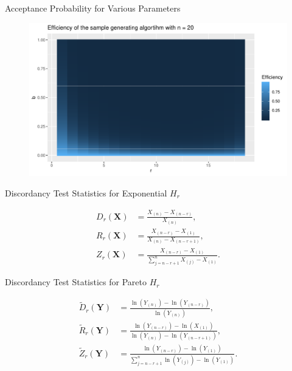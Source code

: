 \documentclass{beamer}
\theoremstyle{definition}
\theoremstyle{remark}
\begin{document}

\begin{frame}{Acceptance Probability for Various Parameters}
        \begin{figure}
            \includegraphics[scale = 0.5]{plot_eff.pdf}
        \end{figure}
    \end{frame}
    

\begin{frame}{Discordancy Test Statistics for Exponential $H_r$}

    \begin{align*}
        D_r(\mathbf X) &= \frac{X_{(n)} - X_{(n-r)}}{X_{(n)}},  \\
        R_r(\mathbf X) &= \frac{X_{(n-r)} - X_{(1)}}{X_{(n)} - X_{(n-r+1)}}, \\
        Z_r(\mathbf X) &= \frac{X_{(n-r)} -X_{(1)}}{\sum_{j = n - r + 1}^n X_{(j)} - X_{(1)}}.
    \end{align*}
\end{frame}


\begin{frame}{Discordancy Test Statistics for Pareto $H_r$}
    
    \begin{align*}
        \tilde D_r(\mathbf Y) &= \frac{\ln(Y_{(n)}) - \ln(Y_{(n-r)})}{\ln(Y_{(n)})}, \label{eqn: modified Dr} \\
        \tilde R_r(\mathbf Y)  &= \frac{\ln(Y_{(n-r)}) - \ln(X_{(1)})}{\ln(Y_{(n)}) - \ln(Y_{(n-r+1)})}, \\
        \tilde Z_r(\mathbf Y) &= \frac{\ln(Y_{(n-r)}) - \ln(Y_{(1)})}{\sum_{j = n - r + 1}^n \ln(Y_{(j)}) - \ln(Y_{(1)})}.
    \end{align*}
\end{frame}
\end{document}
